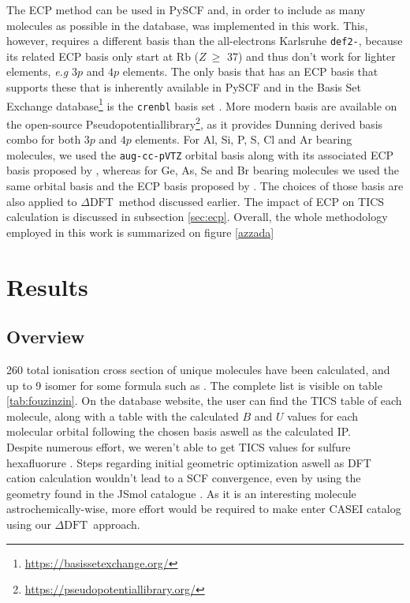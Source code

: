 \documentclass[article,preview]{planetary}
\newcommand{\dft}{\ensuremath{\Delta\textrm{DFT}}}
\begin{document}
The ECP method can be used in PySCF and, in order to include as many molecules as possible in the database, was implemented in this work. This, however, requires a different basis than the all-electrons Karlsruhe \verb+def2-+, because its related ECP basis only start at Rb ($Z~\geq$ 37) and thus don't work for lighter elements, \textit{e.g} $3p$ and $4p$ elements. The only basis that has an ECP basis that supports  these that is inherently available in PySCF and in the Basis Set Exchange database\footnote{\url{https://basissetexchange.org/}} \parencites{pritchardNewBasisSet2019} is the \verb|crenbl| basis set \parencites{hurleyInitioRelativisticEffective1986,fernandezpaciosInitioRelativisticEffective1985}. More modern basis are available on the open-source Pseudopotentiallibrary\footnote{\url{https://pseudopotentiallibrary.org/}}, as it provides Dunning derived basis combo for both $3p$ and $4p$ elements.  For Al, Si, P, S, Cl and Ar bearing molecules, we used the \verb|aug-cc-pVTZ| orbital basis along with its associated ECP basis proposed by \parencites{bennettNewGenerationEffective2018}, whereas for Ge, As, Se and Br bearing molecules we used the same orbital basis and the ECP basis proposed by \parencites{wangNewGenerationEffective2019}. The choices of those basis are also applied to \dft~method discussed earlier. The impact of ECP on TICS calculation is discussed in subsection \ref{sec:ecp}. Overall, the whole methodology employed in this work is summarized on figure \ref{azzada}


\section{Results}
\subsection{Overview}
260 total ionisation cross section of unique molecules have been calculated, and up to 9 isomer for some formula such as . The complete list is visible on table \ref{tab:fouzinzin}. On the database website, the user can find the TICS table of each molecule, along with a table with the calculated $B$ and $U$ values for each molecular orbital following the chosen basis aswell as the calculated IP.\\
Despite numerous effort, we weren't able to get TICS values for sulfure hexafluorure . Steps regarding initial geometric optimization aswell as DFT cation calculation wouldn't lead to a SCF convergence, even by using the geometry found in the JSmol catalogue \parencite{hansonJmolParadigmShift2010}. As it is an interesting molecule astrochemically-wise, more effort would be required to make  enter CASEI catalog using our \dft~approach. 
\end{document}
